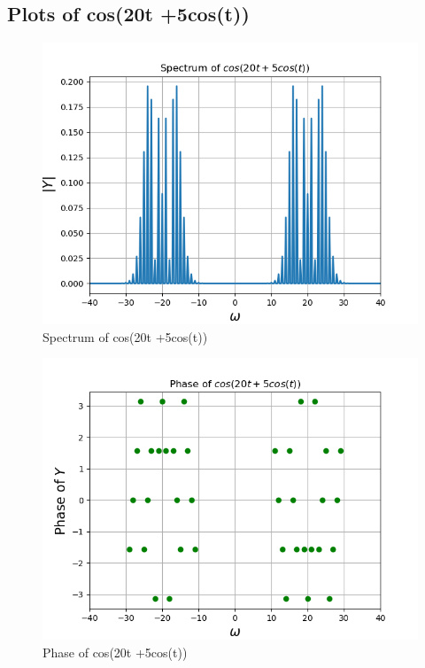 \documentclass[11pt]{article}
\begin{document}
\subsection{Plots of cos(20t +5cos(t))}
\begin{figure}[H]
    \centering
    \includegraphics[scale = 0.75]{Figure_6a.png}
    \caption{Spectrum of cos(20t +5cos(t))}
\end{figure}
\begin{figure}[H]
    \centering
    \includegraphics[scale = 0.75]{Figure_6b.png}
    \caption{Phase of cos(20t +5cos(t))}
\end{figure}
\end{document}
